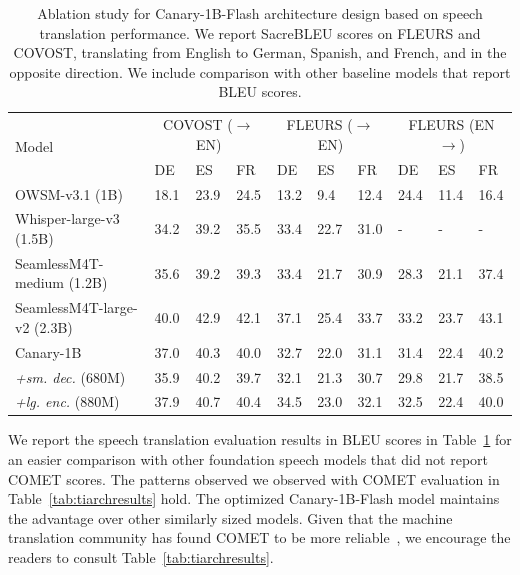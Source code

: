 \documentclass[11pt]{article}
\begin{document}
\begin{table}[t]
\centering
\caption{Ablation study for Canary-1B-Flash architecture design based on speech translation performance. We report SacreBLEU scores on FLEURS and COVOST, translating from English to German, Spanish, and French, and in the opposite direction. We include comparison with other baseline models that report BLEU scores.}
\begin{tabular}{|l|lll|lll|lll|}
\hline
\multirow{2}{*}{Model} & \multicolumn{3}{c|}{COVOST ($\rightarrow$EN)}                                      & \multicolumn{3}{c|}{FLEURS ($\rightarrow$EN)} & \multicolumn{3}{c|}{FLEURS (EN$\rightarrow$)} \\
                       & DE & ES & FR & DE & ES & FR & DE & ES & FR \\
\hline
OWSM-v3.1 (1B) & 18.1 & 23.9 & 24.5 & 13.2 & 9.4 & 12.4 & 24.4 & 11.4 & 16.4 \\
Whisper-large-v3 (1.5B) & 34.2 & 39.2 & 35.5 & 33.4 & 22.7 & 31.0 & - & - & - \\
SeamlessM4T-medium (1.2B) & 35.6 & 39.2 & 39.3 & 33.4 & 21.7 & 30.9 & 28.3 & 21.1 & 37.4 \\
SeamlessM4T-large-v2 (2.3B) & 40.0 & 42.9 & 42.1 & 37.1 & 25.4 & 33.7 & 33.2 & 23.7 & 43.1 \\
\hline
Canary-1B & 37.0 & 40.3 & 40.0 & 32.7 & 22.0 & 31.1 & 31.4 & 22.4 & 40.2 \\
\textit{+sm. dec.} (680M) & 35.9 & 40.2 & 39.7 & 32.1 & 21.3 & 30.7 & 29.8 & 21.7 & 38.5 \\
\textit{+lg. enc.} (880M) & 37.9 & 40.7 & 40.4 & 34.5 & 23.0 & 32.1 & 32.5 & 22.4 & 40.0 \\
\hline
\end{tabular}
\label{tab:tiarchresults_bleu}
\end{table}

We report the speech translation evaluation results in BLEU scores in Table~\ref{tab:tiarchresults_bleu} for an easier comparison with other foundation speech models that did not report COMET scores. The patterns observed we observed with COMET evaluation in Table~\ref{tab:tiarchresults} hold. The optimized Canary-1B-Flash model maintains the advantage over other similarly sized models.
Given that the machine translation community has found COMET to be more reliable~\cite{mathur-etal-2020-tangled}, we encourage the readers to consult Table~\ref{tab:tiarchresults}.
\end{document}
